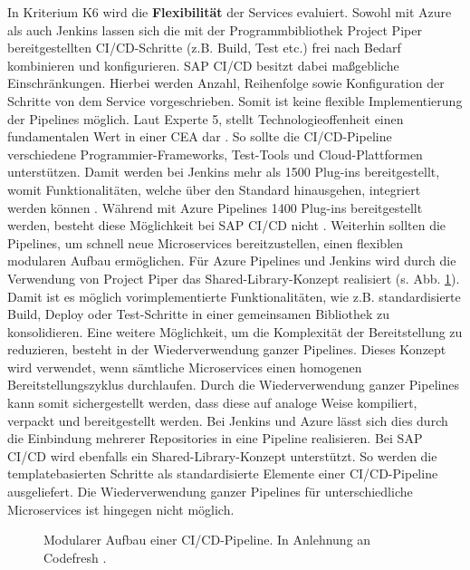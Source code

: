In Kriterium K6 wird die \textbf{Flexibilität} der Services evaluiert. Sowohl mit Azure als auch Jenkins lassen sich die mit der Programmbibliothek Project Piper bereitgestellten CI/CD-Schritte (z.B. Build, Test etc.) frei nach Bedarf kombinieren und konfigurieren. SAP CI/CD besitzt dabei maßgebliche Einschränkungen. Hierbei werden Anzahl, Reihenfolge sowie Konfiguration der Schritte von dem Service vorgeschrieben. Somit ist keine flexible Implementierung der Pipelines möglich. Laut Experte 5, stellt Technologieoffenheit einen fundamentalen Wert in einer CEA dar \cite[Z. 10]{SoftwareArchitektSAPDTSIntegration.}. So sollte die CI/CD-Pipeline verschiedene Programmier-Frameworks, Test-Tools und Cloud-Plattformen unterstützen. Damit werden bei Jenkins mehr als 1500 Plug-ins bereitgestellt, womit Funktionalitäten, welche über den Standard hinausgehen, integriert werden können \cite{.20230410c}. Während mit Azure Pipelines 1400 Plug-ins bereitgestellt werden, besteht diese Möglichkeit bei SAP CI/CD nicht \cite{.20230410d}. Weiterhin sollten die Pipelines, um schnell neue Microservices bereitzustellen, einen flexiblen modularen Aufbau ermöglichen. Für Azure Pipelines und Jenkins wird durch die Verwendung von Project Piper das Shared-Library-Konzept realisiert (s. Abb. \ref{fig:Modular}). Damit ist es möglich vorimplementierte Funktionalitäten, wie z.B. standardisierte Build, Deploy oder Test-Schritte in einer gemeinsamen Bibliothek zu konsolidieren. Eine weitere Möglichkeit, um die Komplexität der Bereitstellung zu reduzieren, besteht in der Wiederverwendung ganzer Pipelines. Dieses Konzept wird verwendet, wenn sämtliche Microservices einen homogenen Bereitstellungszyklus durchlaufen. Durch die Wiederverwendung ganzer Pipelines kann somit sichergestellt werden, dass diese auf analoge Weise kompiliert, verpackt und bereitgestellt werden. Bei Jenkins und Azure lässt sich dies durch die Einbindung mehrerer Repositories in eine Pipeline realisieren. Bei SAP CI/CD wird ebenfalls ein Shared-Library-Konzept unterstützt. So werden die templatebasierten Schritte als standardisierte Elemente einer CI/CD-Pipeline ausgeliefert. Die Wiederverwendung ganzer Pipelines für unterschiedliche Microservices ist hingegen nicht möglich.
\begin{center}
	\begin{figure}[H]
		\centering
		\caption[Modularer Aufbau einer CI/CD-Pipeline]{Modularer Aufbau einer CI/CD-Pipeline. In Anlehnung an Codefresh \cite{.20230402}.}
		\label{fig:Modular}
	\end{figure}
\end{center}
